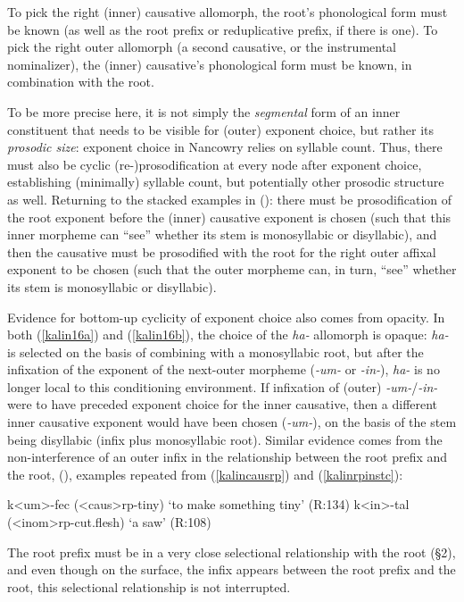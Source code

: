 \documentclass[output=paper,colorlinks,citecolor=brown,
]{langscibook}
\newcounter{nexttmp}    %
\newcounter{lasttmp}    %
\newcommand{\Next}{\setcounter{nexttmp}{\value{equation}}\stepcounter{nexttmp}(\thenexttmp)\xspace}
\newcommand{\Last}{\setcounter{lasttmp}{\value{equation}}(\thelasttmp)\xspace}
\begin{document}
\noindent To pick the right (inner) causative allomorph, the root's phonological form must be known (as well as the root prefix or reduplicative prefix, if there is one). To pick the right outer allomorph (a second causative, or the instrumental nominalizer), the (inner) causative's phonological form must be known, in combination with the root.

To be more precise here, it is not simply the {\it segmental} form of an inner constituent that needs to be visible for (outer) exponent choice, but rather its {\it prosodic size}: exponent choice in Nancowry relies on syllable count. Thus, there must also be cyclic (re-)prosodification at every node after exponent choice, establishing (minimally) syllable count, but potentially other prosodic structure as well. Returning to the stacked examples in \Last: there must be prosodification of the root exponent before the (inner) causative exponent is chosen (such that this inner morpheme can ``see'' whether its stem is monosyllabic or disyllabic), and then the causative must be prosodified with the root for the right outer affixal exponent to be chosen (such that the outer morpheme can, in turn, ``see'' whether its stem is monosyllabic or disyllabic). 

Evidence for bottom-up cyclicity of exponent choice also comes from opacity. In both (\ref{kalin16a}) and (\ref{kalin16b}), the choice of the \textit{ha-} allomorph is opaque: \textit{ha-} is selected on the basis of combining with a monosyllabic root, but after the infixation of the exponent of the next-outer morpheme (\textit{-um-} or \textit{-in-}), \textit{ha-} is no longer local to this conditioning environment. If infixation of (outer)  \textit{-um-}/\textit{-in-} were to have preceded exponent choice for the inner causative, then a different inner causative exponent would have been chosen (\textit{-um-}), on the basis of the stem being disyllabic (infix plus monosyllabic root). Similar evidence comes from the non-interference of an outer infix in the relationship between the root prefix and the root, \Next, examples repeated from (\ref{kalincausrp}) and (\ref{kalinrpinstc}):

\ea \label{kalin17}
\ea k<um>-fec ({\sc <caus>}{\sc rp-}tiny) \hfill  `to make something tiny'  (R:134)\label{kalin17a}
\ex k<in>-tal ({\sc <inom>rp-}cut.flesh) \hfill `a saw' (R:108)\label{kalin17b}
\z
\z

\noindent The root prefix must be in a very close selectional relationship with the root (\S2), and even though on the surface, the infix appears between the root prefix and the root, this selectional relationship is not interrupted. 
\end{document}
